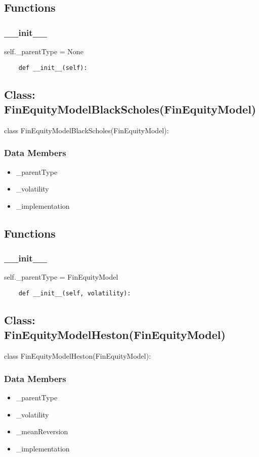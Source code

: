 \documentclass[twoside,11pt]{book}
\begin{document}
\subsection*{Functions}

\subsubsection*{{\bf \_\_init\_\_}}
self.\_parentType = None 

\begin{lstlisting}
    def __init__(self):
\end{lstlisting}

\subsection*{Class: FinEquityModelBlackScholes(FinEquityModel)}
class FinEquityModelBlackScholes(FinEquityModel): 

\subsubsection*{Data Members}
\begin{itemize}
\item{\_parentType}
\item{\_volatility}
\item{\_implementation}
\end{itemize}

\subsection*{Functions}

\subsubsection*{{\bf \_\_init\_\_}}
self.\_parentType = FinEquityModel 

\begin{lstlisting}
    def __init__(self, volatility):
\end{lstlisting}

\subsection*{Class: FinEquityModelHeston(FinEquityModel)}
class FinEquityModelHeston(FinEquityModel): 

\subsubsection*{Data Members}
\begin{itemize}
\item{\_parentType}
\item{\_volatility}
\item{\_meanReversion}
\item{\_implementation}
\end{itemize}
\end{document}
